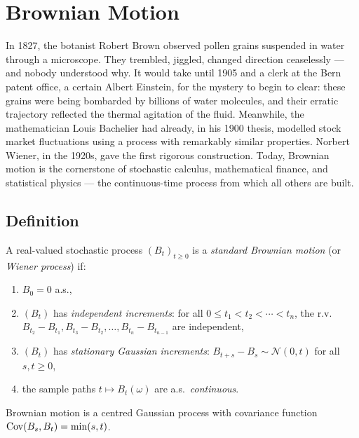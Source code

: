 \chapter{Brownian Motion}
\label{ch:brownian}

In 1827, the botanist Robert Brown observed pollen grains suspended in water through a microscope. They trembled, jiggled, changed direction ceaselessly --- and nobody understood why. It would take until 1905 and a clerk at the Bern patent office, a certain Albert Einstein, for the mystery to begin to clear: these grains were being bombarded by billions of water molecules, and their erratic trajectory reflected the thermal agitation of the fluid. Meanwhile, the mathematician Louis Bachelier had already, in his 1900 thesis, modelled stock market fluctuations using a process with remarkably similar properties. Norbert Wiener, in the 1920s, gave the first rigorous construction. Today, Brownian motion is the cornerstone of stochastic calculus, mathematical finance, and statistical physics --- the continuous-time process from which all others are built.

\section{Definition}

\begin{definition}
\label{def:brownian}
A real-valued stochastic process $(B_t)_{t \geq 0}$ is a \emph{standard Brownian
motion} (or \emph{Wiener process}) if:
\begin{enumerate}
  \item $B_0 = 0$ a.s.,
  \item $(B_t)$ has \emph{independent increments}: for all
    $0 \leq t_1 < t_2 < \cdots < t_n$, the r.v.\
    $B_{t_2} - B_{t_1}, B_{t_3} - B_{t_2}, \ldots, B_{t_n} - B_{t_{n-1}}$
    are independent,
  \item $(B_t)$ has \emph{stationary Gaussian increments}:
    $B_{t+s} - B_s \sim \mathcal{N}(0, t)$ for all $s, t \geq 0$,
  \item the sample paths $t \mapsto B_t(\omega)$ are a.s.\ \emph{continuous}.
\end{enumerate}
\end{definition}

\begin{remark}
Brownian motion is a centred Gaussian process with covariance function
$\mathrm{Cov}(B_s, B_t) = \min(s, t)$.
\end{remark}

